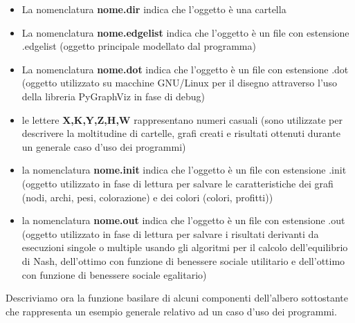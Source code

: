 \begin{itemize}
	\item La nomenclatura \textbf{nome.dir} indica che l'oggetto è una cartella
	\item La nomenclatura \textbf{nome.edgelist} indica che l'oggetto è un file con estensione .edgelist (oggetto principale modellato dal programma)
	\item La nomenclatura \textbf{nome.dot} indica che l'oggetto è un file con estensione .dot (oggetto utilizzato su macchine GNU/Linux per il disegno attraverso l'uso della libreria PyGraphViz in fase di debug)
	\item le lettere \textbf{X,K,Y,Z,H,W} rappresentano numeri casuali (sono utilizzate per descrivere la moltitudine di cartelle, grafi creati e risultati ottenuti durante un generale caso d'uso dei programmi)
	\item la nomenclatura \textbf{nome.init} indica che l'oggetto è un file con estensione .init (oggetto utilizzato in fase di lettura per salvare le caratteristiche dei grafi (nodi, archi, pesi, colorazione) e dei colori (colori, profitti))
	\item la nomenclatura \textbf{nome.out} indica che l'oggetto è un file con estensione .out (oggetto utilizzato in fase di lettura per salvare i risultati derivanti da esecuzioni singole o multiple usando gli algoritmi per il calcolo dell'equilibrio di Nash, dell'ottimo con funzione di benessere sociale utilitario e dell'ottimo con funzione di benessere sociale egalitario)
\end{itemize}

Descriviamo ora la funzione basilare di alcuni componenti dell'albero sottostante che rappresenta un esempio generale relativo ad un caso d'uso dei programmi.

